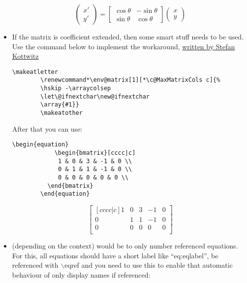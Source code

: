 \begin{itemize}
    \[ \begin{pmatrix}x'\\y'\end{pmatrix}=
    \begin{bmatrix}
        \cos\theta & -\sin\theta\\
        \sin\theta & \cos\theta
    \end{bmatrix}
    \begin{pmatrix}x \\y \end{pmatrix} \]

    \item If the matrix is coefficient extended, then some smart stuff needs to be used. Use the command below to implement the workaround, \href{http://texblog.net/latex-archive/maths/amsmath-matrix/}{\ul{written by Stefan Kottwitz}}
    \begin{lstlisting}[language = Tex, numbers = none]
        \makeatletter
        \renewcommand*\env@matrix[1][*\c@MaxMatrixCols c]{%
        \hskip -\arraycolsep
        \let\@ifnextchar\new@ifnextchar
        \array{#1}}
        \makeatother
    \end{lstlisting}
    After that you can use:
    \begin{lstlisting}[language = Tex, numbers = none]
        \begin{equation}
            \begin{bmatrix}[cccc|c]
             1 & 0 & 3 & -1 & 0 \\
             0 & 1 & 1 & -1 & 0 \\
             0 & 0 & 0 & 0 & 0 \\
          \end{bmatrix}
        \end{equation}
    \end{lstlisting}
    \begin{equation}
        \begin{bmatrix}[cccc|c]
         1 & 0 & 3 & -1 & 0 \\
         0 & 1 & 1 & -1 & 0 \\
         0 & 0 & 0 & 0 & 0 \\
        \end{bmatrix}
    \end{equation}
    \item {} (depending on the context) would be to only number referenced equations. For this, all equations should have a short label like ``eq:eqlabel'', be referenced with $\backslash$eqref and you need to use this to enable that automatic behaviour of only display names if referenced:

\end{itemize}
